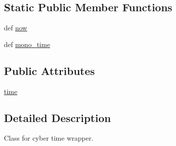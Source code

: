 \subsection*{Static Public Member Functions}
\begin{DoxyCompactItemize}
\item 
def \hyperlink{classcyber__py_1_1cyber__time_1_1Time_a7730ee8a23b5e33b5090b554cea6cc05}{now}
\item 
def \hyperlink{classcyber__py_1_1cyber__time_1_1Time_a7f0d4009b78f4133c797fdb860af15e6}{mono\-\_\-time}
\end{DoxyCompactItemize}
\subsection*{Public Attributes}
\begin{DoxyCompactItemize}
\item 
\hyperlink{classcyber__py_1_1cyber__time_1_1Time_a2d81299f5e8afeea1e3a8807ffc9fb1f}{time}
\end{DoxyCompactItemize}


\subsection{Detailed Description}
\begin{DoxyVerb}Class for cyber time wrapper.
\end{DoxyVerb}
 

